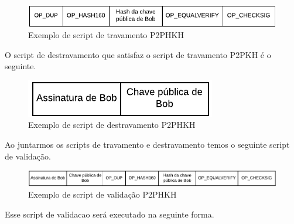 \documentclass[conference,compsoc]{IEEEtran}
\begin{document}
\begin{figure}[H]
    \centering
    \includegraphics[keepaspectratio=true, scale=0.7]{img/P2PHKH_script_travamento.pdf}
    \caption{Exemplo de script de travamento P2PHKH}
    \label{fig:P2PKH_Travamento}
\end{figure}

O script de destravamento que satisfaz o script de travamento P2PKH é o seguinte.

\begin{figure}[H]
    \centering
    \includegraphics[keepaspectratio=true, scale=0.8]{img/P2PHKH_script_destravamento.pdf}
    \caption{Exemplo de script de destravamento P2PHKH}
    \label{fig:P2PKH_Destravamento}
\end{figure}

Ao juntarmos os scripts de travamento e destravamento temos o seguinte script de validação.

\begin{figure}[H]
    \centering
    \includegraphics[keepaspectratio=true, scale=0.47]{img/P2PHKH_script_validacao.pdf}
    \caption{Exemplo de script de validação P2PHKH}
    \label{fig:P2PKH_Validacao}
\end{figure}

Esse script de validacao será executado na seguinte forma.
\end{document}
